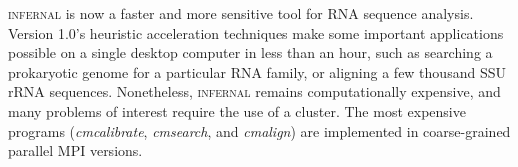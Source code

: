 
\textsc{infernal} is now a faster and more sensitive tool for RNA
sequence analysis.  Version 1.0's heuristic acceleration techniques
make some important applications possible on a single desktop computer
in less than an hour, such as searching a prokaryotic genome for a
particular RNA family, or aligning a few thousand SSU rRNA sequences.
Nonetheless, \textsc{infernal} remains computationally expensive, and many
problems of interest require the use of a cluster.  The most expensive
programs (\emph{cmcalibrate}, \emph{cmsearch}, and \emph{cmalign}) are
implemented in coarse-grained parallel MPI versions.






\begin{comment}
The complete \textsc{infernal} version 1.0 software package, including
documentation and ANSI C source code, may be downloaded from
\url{http://infernal.janelia.org}. \textsc{infernal} uses a GNU
configure system and should be portable to any POSIX-compliant
operating system, including Linux and Mac OS/X.
\end{comment}
